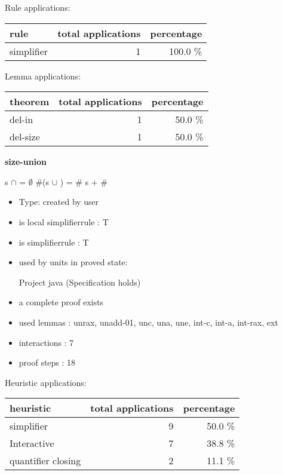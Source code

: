 \documentclass[a4paper]{article}
\begin{document}
Rule applications:

\begin{supertabular}{l|r|r}
rule	        & total applications & percentage \\ \hline
simplifier & 1 & 100.0 \% \\

\end{supertabular}

Lemma applications:

\begin{supertabular}{l|r|r}
theorem	        & total applications & percentage \\ \hline
del-in & 1 & 50.0 \% \\
del-size & 1 & 50.0 \% \\

\end{supertabular}
\pagebreak

{\LARGE\bf size-union}\label{lemma-size-union}

\medskip

 \Fol s $\cap$  = $\emptyset$ \Imp \#(s $\cup$ ) = \# s + \# 

\begin{itemize}

\item Type: created by user

\item is local simplifierrule : T
\item is simplifierrule : T
\item used by units in proved state:

Project java (Specification holds)
\item       a complete proof exists
\item       used lemmas  : unrax, unadd-01, unc, una, une, int-c, int-a, int-rax, ext
\item       interactions : 7
\item       proof steps  : 18
\end{itemize}

\medskip


Heuristic applications:

\begin{supertabular}{l|r|r}
heuristic	& total applications & percentage \\ \hline
simplifier & 9 & 50.0 \% \\
Interactive & 7 & 38.8 \% \\
quantifier closing & 2 & 11.1 \% \\

\end{supertabular}
\end{document}
